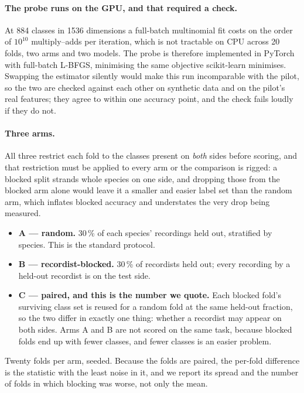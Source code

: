 \documentclass[10pt,twocolumn,a4paper]{article}
\begin{document}
\paragraph{The probe runs on the GPU, and that required a check.} At 884 classes in 1536
dimensions a full-batch multinomial fit costs on the order of $10^{10}$ multiply--adds per
iteration, which is not tractable on CPU across 20 folds, two arms and two models. The probe
is therefore implemented in PyTorch with full-batch L-BFGS, minimising the same objective
scikit-learn minimises. Swapping the estimator silently would make this run incomparable with
the pilot, so the two are checked against each other on synthetic data and on the pilot's real
features; they agree to within one accuracy point, and the check fails loudly if they do not.

\paragraph{Three arms.} All three restrict each fold to the classes present on
\emph{both} sides before scoring, and that restriction must be applied to every arm or the
comparison is rigged: a blocked split strands whole species on one side, and dropping those
from the blocked arm alone would leave it a smaller and easier label set than the random arm,
which inflates blocked accuracy and understates the very drop being measured.

\begin{itemize}
  \item \textbf{A --- random.} 30\,\% of each species' recordings held out, stratified by
    species. This is the standard protocol.
  \item \textbf{B --- recordist-blocked.} 30\,\% of recordists held out; every recording by a
    held-out recordist is on the test side.
  \item \textbf{C --- paired, and this is the number we quote.} Each blocked fold's surviving
    class set is reused for a random fold at the same held-out fraction, so the two differ in
    exactly one thing: whether a recordist may appear on both sides. Arms A and B are not
    scored on the same task, because blocked folds end up with fewer classes, and fewer
    classes is an easier problem.
\end{itemize}

Twenty folds per arm, seeded. Because the folds are paired, the per-fold difference is the
statistic with the least noise in it, and we report its spread and the number of folds in
which blocking was worse, not only the mean.
\end{document}
